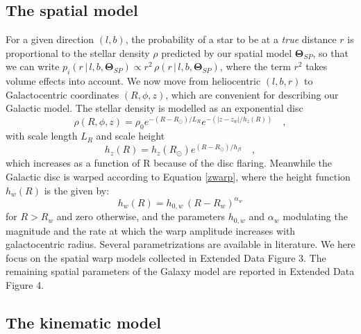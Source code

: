\documentclass{nature}
\begin{document}
\begin{methods}
\subsection{The spatial model \label{sp}} 
For a given direction $(l,b)$, the probability of a star to be at a \emph{true} distance $r$ is proportional to the stellar density $\rho$ predicted by our spatial model $\boldsymbol{\Theta}_{SP}$, so that we can write $ p_i(r \, | \, l, b, \boldsymbol{\Theta}_{SP}) \propto r^2 \,\rho(r \, | \, l, b, \boldsymbol{\Theta}_{SP} ) $, where the term $ r^2$ takes volume effects into account. We now move from heliocentric $(l, b, r)$ to Galactocentric coordinates $(R,\phi, z)$, which are convenient for describing our Galactic model. The stellar density is modelled as an exponential disc
\begin {equation}
\label{density} 
\rho(R,\phi, z) = \rho_0  e^{-(R - R_{\odot})/L_R}  e^{-(|z- z_w|/h_z(R))}\quad,
\end{equation}
with scale length $L_R$ and scale height
\begin {equation}
\label{flare} 
h_z(R) = h_z(R_{\odot}) e^{(R - R_{\odot})/h_{fl}}\quad,
\end{equation}
which increases as a function of R because of the disc flaring.  Meanwhile the Galactic disc is warped according to Equation \ref{zwarp},
where the height function $h_w(R)$ is the given by:
\begin {equation}
\label{hzwarp} 
h_w(R)=h_{0,w} \, (R-R_w)^{\alpha_w} 
\end{equation}
for $R > R_w$ and zero otherwise, and the parameters $h_{0,w}$ and $\alpha_w$ modulating the magnitude and the rate at which the warp amplitude increases with galactocentric radius.
Several parametrizations are available in literature\cite{Skowron:2019,Chen:2019,Reyle:2009,Robin:2008,Marshall:2006,Yusifov:2004,Drimmel:2001}. We here focus on the spatial warp models collected in Extended Data Figure 3. The remaining spatial parameters of the Galaxy model are reported in Extended Data Figure 4. 



\subsection{The kinematic model \label{kin}}


\end{methods}
\end{document}
